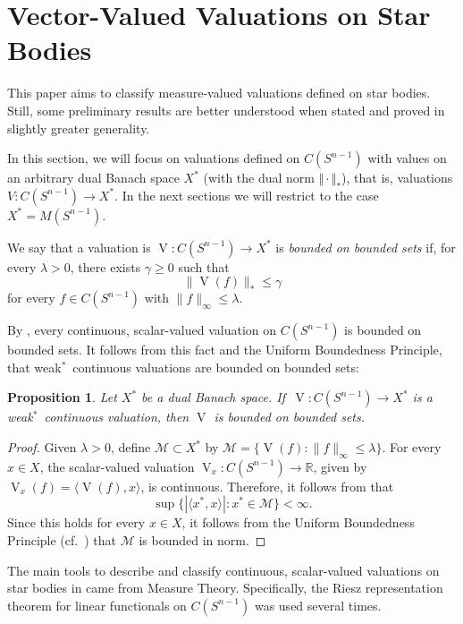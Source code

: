 \documentclass[11pt, a4paper]{amsart}
\newtheorem{proposition}{Proposition}[section]
\newcommand{\sn}{{S^{n-1}}}
\newcommand{\oV}{\operatorname{V}}
\newcommand{\R}{\mathbb R}
\begin{document}
\section{Vector-Valued Valuations on Star Bodies} \label{s:vvv}

This paper aims to classify measure-valued valuations defined on star bodies. Still, some preliminary results are better understood when stated and proved in slightly greater generality. 

In this section, we will focus on valuations defined on $C(\sn)$ with values on an arbitrary dual Banach space $X^*$ (with the dual norm $\Vert \cdot\Vert_*$), that is, valuations $V:C(\sn)\to X^*$. In the next sections we will  restrict to the case $X^*=M(\sn )$.

We say that a valuation is $\oV\colon C(\sn )\to X^*$ is {\em bounded on bounded sets} if, for every $\lambda>0$, there exists $\gamma\geq 0$ such that
$$\|\oV(f)\|_*\leq \gamma$$
for every $f \in C(\sn )$ with $\|f\|_{\scriptscriptstyle \infty}\leq \lambda$. 


By \cite[Lemma 3.1]{TrViJMAA}, every continuous, scalar-valued valuation on $C(\sn )$ is bounded on bounded sets. It follows from this fact and the Uniform Boundedness Principle, that weak$^*$~continuous valuations are bounded on bounded sets:

\begin{proposition}\label{p:bbs}
Let $X^*$ be a dual Banach space. If  $\,\oV\colon C(\sn )\to X^*$ is a weak$^*$~continuous valuation, then $\oV$ is bounded on bounded sets. 
\end{proposition}

\begin{proof} Given $\lambda>0$, define $\mathcal M\subset X^*$ by $\mathcal M=\{\oV(f)\colon\|f\|_{\scriptscriptstyle \infty}\leq \lambda\}$. For every $x\in X$, the scalar-valued valuation $\oV_x\colon C(\sn )\to \R$, given by $\oV_x(f)=\langle \oV(f),x\rangle$, is continuous. Therefore, it follows from  \cite[Lemma 3.1]{TrViJMAA} that 
$$
\sup\{|\langle x^*,x\rangle|:x^*\in \mathcal M\}<\infty.
$$
Since this holds for every $x\in X$, it follows from the Uniform Boundedness Principle (cf.\ \cite[Theorem 3.15]{fabianetal}) that $\mathcal M$ is bounded in norm.
\end{proof}

The main tools to describe and classify continuous, scalar-valued valuations on star bodies in \cite{TrViJMAA, TrViIntRep, Vi} came from Measure Theory. Specifically, the Riesz representation theorem for linear functionals on $C(\sn )$ was used several times. 
\end{document}

